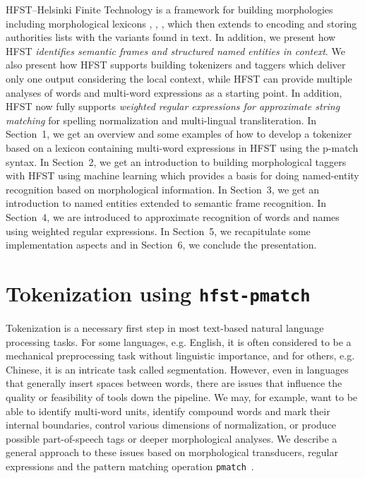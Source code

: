\documentclass{llncs}
\begin{document}
HFST--Helsinki Finite Technology is a framework for building
morphologies including morphological lexicons \cite{hfst-pmatch}, \cite{hfst/2011}, \cite{linden/2009/sfcm}, which then extends to
encoding and storing authorities lists with the variants found in text. In
addition, we present how HFST \emph{identifies semantic frames and structured
named entities in context}.  We also present how HFST supports building tokenizers and
taggers which deliver only one output considering the local context, 
while HFST can provide multiple analyses of words and multi-word expressions as a starting point. 
In addition, HFST now fully supports \emph{weighted regular expressions for approximate string matching} 
for spelling normalization and multi-lingual transliteration. In
Section~1, we get an overview and some examples of how to develop a
tokenizer based on a lexicon containing multi-word expressions in HFST
using the p-match syntax. In Section~2, we get an introduction to
building morphological taggers with HFST using machine learning which
provides a basis for doing named-entity recognition based on
morphological information. In Section~3, we get an introduction to
named entities extended to semantic frame recognition. In Section~4,
we are introduced to approximate recognition of words and names using
weighted regular expressions. In Section~5, we recapitulate some implementation aspects 
and in Section~6, we conclude the presentation.

\section{Tokenization using {\tt hfst-pmatch}}\label{sec:tokenization}
Tokenization is a necessary first step in most text-based natural language processing tasks. For some
languages, e.g. English, it is often considered to be a mechanical
preprocessing task without linguistic importance, and for others, e.g. Chinese,
it is an intricate task called segmentation. However, even in languages that generally insert spaces between words, there
are issues that influence the quality or feasibility of tools down the
pipeline. We may, for example, want to be able to identify multi-word units,
identify compound words and mark their internal boundaries, control various
dimensions of normalization, or produce possible part-of-speech tags or
deeper morphological analyses. We describe a general approach to these issues based on morphological
transducers, regular expressions and the pattern matching operation
\verb+pmatch+~\cite{karttunen/2011}.
\end{document}
